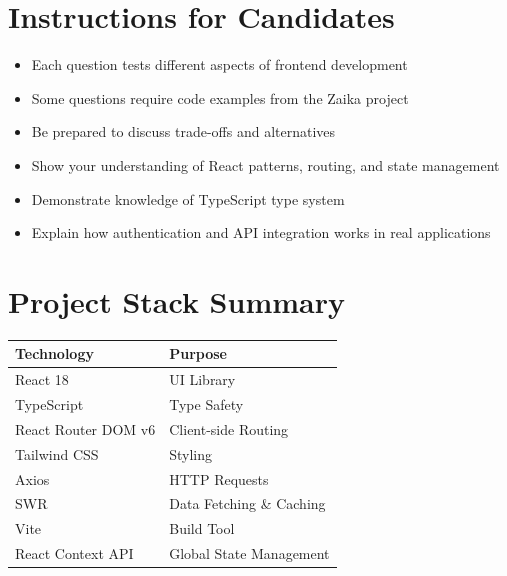 \documentclass[12pt]{article}
\begin{document}
\vspace{2cm}

\section*{Instructions for Candidates}

\begin{itemize}
    \item Each question tests different aspects of frontend development
    \item Some questions require code examples from the Zaika project
    \item Be prepared to discuss trade-offs and alternatives
    \item Show your understanding of React patterns, routing, and state management
    \item Demonstrate knowledge of TypeScript type system
    \item Explain how authentication and API integration works in real applications
\end{itemize}

\vspace{1cm}

\section*{Project Stack Summary}

\begin{center}
\begin{tabular}{|l|l|}
\hline
\textbf{Technology} & \textbf{Purpose} \\
\hline
React 18 & UI Library \\
TypeScript & Type Safety \\
React Router DOM v6 & Client-side Routing \\
Tailwind CSS & Styling \\
Axios & HTTP Requests \\
SWR & Data Fetching \& Caching \\
Vite & Build Tool \\
React Context API & Global State Management \\
\hline
\end{tabular}
\end{center}
\end{document}
